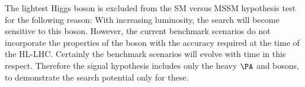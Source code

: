 The lightest Higgs boson \Ph is excluded from the SM versus MSSM hypothesis test for the following reason:
With increasing luminosity, the search will become sensitive to this boson. However, the current benchmark scenarios do not
incorporate the properties of the \Ph boson with the accuracy required at the time of the HL-LHC.
Certainly the benchmark scenarios will evolve with time in this respect. Therefore the signal hypothesis includes
only the heavy $\PA$ and \PH bosons, to demonstrate the search potential only for these.